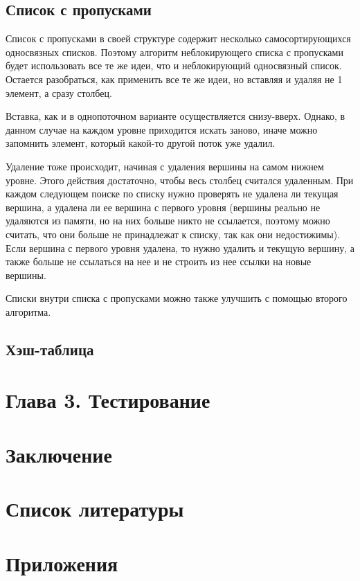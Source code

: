 \documentclass[12pt]{article}
\begin{document}
{			\subsection{Список с пропусками}
				\par Список с пропусками в своей структуре содержит несколько самосортирующихся односвязных списков. Поэтому алгоритм неблокирующего списка с пропусками будет использовать все те же идеи, что и неблокирующий односвязный список. Остается разобраться, как применить все те же идеи, но вставляя и удаляя не 1 элемент, а сразу столбец. 
				\par Вставка, как и в однопоточном варианте осуществляется снизу-вверх. Однако, в данном случае на каждом уровне приходится искать заново, иначе можно запомнить элемент, который какой-то другой поток уже удалил.
				\par Удаление тоже происходит, начиная с удаления вершины на самом нижнем уровне. Этого действия достаточно, чтобы весь столбец считался удаленным. При каждом следующем поиске по списку нужно проверять не удалена ли текущая вершина, а удалена ли ее вершина с первого уровня (вершины реально не удаляются из памяти, но на них больше никто не ссылается, поэтому можно считать, что они больше не принадлежат к списку, так как они недостижимы). Если вершина с первого уровня удалена, то нужно удалить и текущую вершину, а также больше не ссылаться на нее и не строить из нее ссылки на новые вершины.
				\par Списки внутри списка с пропусками можно также улучшить с помощью второго алгоритма.
			\subsection{Хэш-таблица}
				
				
		\newpage
		
		\section{Глава 3. Тестирование}
		
		\newpage
		
		\section{Заключение}
		
		\newpage
		
		\section{Список литературы}
		
		\newpage
		
		\section{Приложения}
	}
	
\end{document}
